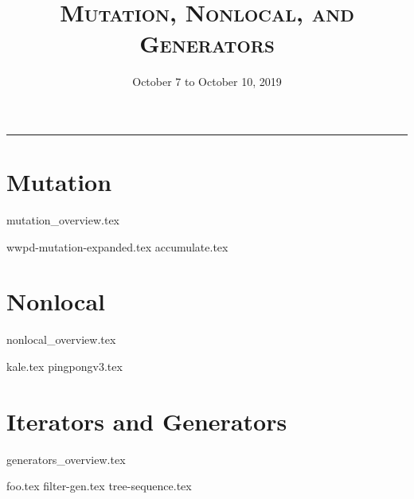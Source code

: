 \documentclass{exam}
\title{\textsc{Mutation, Nonlocal, and Generators}}
\date{October 7 to October 10, 2019}
\begin{document}
\maketitle
\rule{\textwidth}{0.15em}
\fontsize{12}{15}\selectfont

\section{Mutation}
{mutation_overview.tex}
\begin{questions}
{wwpd-mutation-expanded.tex}
\newpage
\newpage
{accumulate.tex}
\end{questions}

\newpage
\section{Nonlocal}
{nonlocal_overview.tex}
\begin{questions}
{kale.tex}
{pingpongv3.tex}
\end{questions}

\section{Iterators and Generators}
{generators_overview.tex}
\begin{questions}
{foo.tex}
{filter-gen.tex}
{tree-sequence.tex}
\end{questions}
\end{document}
